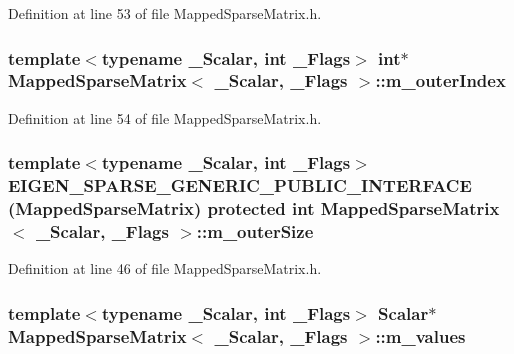 Definition at line 53 of file Mapped\-Sparse\-Matrix.\-h.

\hypertarget{class_mapped_sparse_matrix_a5aa4957bfefea23e2eebedb9e7978509}{
\subsubsection[{m\-\_\-outer\-Index}]{\setlength{\rightskip}{0pt plus 5cm}template$<$typename \-\_\-\-Scalar, int \-\_\-\-Flags$>$ {\bf int}$\ast$ {\bf Mapped\-Sparse\-Matrix}$<$ \-\_\-\-Scalar, \-\_\-\-Flags $>$\-::m\-\_\-outer\-Index}}\label{class_mapped_sparse_matrix_a5aa4957bfefea23e2eebedb9e7978509}


Definition at line 54 of file Mapped\-Sparse\-Matrix.\-h.

\hypertarget{class_mapped_sparse_matrix_af65bb4f338bcf978e2d143efcfe2ed19}{
\subsubsection[{m\-\_\-outer\-Size}]{\setlength{\rightskip}{0pt plus 5cm}template$<$typename \-\_\-\-Scalar, int \-\_\-\-Flags$>$ E\-I\-G\-E\-N\-\_\-\-S\-P\-A\-R\-S\-E\-\_\-\-G\-E\-N\-E\-R\-I\-C\-\_\-\-P\-U\-B\-L\-I\-C\-\_\-\-I\-N\-T\-E\-R\-F\-A\-C\-E ({\bf Mapped\-Sparse\-Matrix}) protected {\bf int} {\bf Mapped\-Sparse\-Matrix}$<$ \-\_\-\-Scalar, \-\_\-\-Flags $>$\-::m\-\_\-outer\-Size}}\label{class_mapped_sparse_matrix_af65bb4f338bcf978e2d143efcfe2ed19}


Definition at line 46 of file Mapped\-Sparse\-Matrix.\-h.

\hypertarget{class_mapped_sparse_matrix_a66fbf9fe136e803d94d0366adaf4b586}{
\subsubsection[{m\-\_\-values}]{\setlength{\rightskip}{0pt plus 5cm}template$<$typename \-\_\-\-Scalar, int \-\_\-\-Flags$>$ {\bf Scalar}$\ast$ {\bf Mapped\-Sparse\-Matrix}$<$ \-\_\-\-Scalar, \-\_\-\-Flags $>$\-::m\-\_\-values}}\label{class_mapped_sparse_matrix_a66fbf9fe136e803d94d0366adaf4b586}


